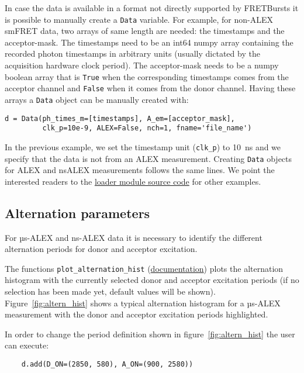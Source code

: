 In case the data is available in a format not directly supported by 
FRETBursts it is possible to manually create a \verb|Data| variable. 
For example, for non-ALEX smFRET data, two arrays of same length are 
needed: the timestamps and the acceptor-mask. The timestamps need to be 
an int64 numpy array containing the recorded photon timestamps in arbitrary 
units (usually dictated by the acquisition hardware clock period). 
The acceptor-mask needs to be a numpy boolean array that is \verb|True| 
when the corresponding timestamps comes from the acceptor channel and 
\verb|False| when it comes from the donor channel. Having these arrays a 
\verb|Data| object can be manually created with:

\begin{verbatim}
d = Data(ph_times_m=[timestamps], A_em=[acceptor_mask], 
         clk_p=10e-9, ALEX=False, nch=1, fname='file_name')
\end{verbatim}

In the previous example, we set the timestamp unit (\verb|clk_p|) to 10~ns 
and we specify that the data is not from an ALEX measurement. Creating 
\verb|Data| objects for ALEX and nsALEX measurements follows the same lines. 
We point the interested readers to the 
\href{https://github.com/tritemio/FRETBursts/blob/master/fretbursts/loader.py}{loader module source code} 
for other examples. 

\subsection{Alternation parameters}
\label{sec:alternation}

For µs-ALEX and ns-ALEX data it is necessary to identify the different 
alternation periods for donor and acceptor excitation.

The functions 
\verb|plot_alternation_hist| (\href{http://fretbursts.readthedocs.org/en/latest/plots.html#fretbursts.burst\_plot.plot\_alternation\_hist}{documentation})
plots the alternation histogram 
with the currently selected donor and acceptor excitation periods
(if no selection has been made yet, default values will be shown).
Figure~\ref{fig:altern_hist} shows a typical alternation histogram for
a µs-ALEX measurement with the donor and acceptor excitation periods highlighted.

In order to change the period definition shown in figure~\ref{fig:altern_hist}
the user can execute:

\begin{verbatim}
    d.add(D_ON=(2850, 580), A_ON=(900, 2580))
\end{verbatim}

